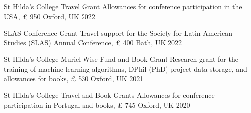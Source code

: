





\vspace{1mm}

\begin{cvhonors}
\cvhonor
{St Hilda's College Travel Grant} 
{Allowances for conference participation in the USA, {\pounds} 950} 
{Oxford, UK}
{2022}
\end{cvhonors}

\vspace{1mm}

\begin{cvhonors}
\cvhonor
{SLAS Conference Grant} 
{Travel support for the Society for Latin American Studies (SLAS) Annual Conference, {\pounds} 400}
{Bath, UK}
{2022}
\end{cvhonors}

\vspace{1mm}

\begin{cvhonors}
\cvhonor
{St Hilda's College Muriel Wise Fund and Book Grant} 
{Research grant for the training of machine learning algorithms, DPhil (PhD) project data storage, and allowances for books, {\pounds} 530} 
{Oxford, UK}
{2021}
\end{cvhonors}

\vspace{1mm}

\begin{cvhonors}
\cvhonor
{St Hilda's College Travel and Book Grants} 
{Allowances for conference participation in Portugal and books, {\pounds} 745} 
{Oxford, UK}
{2020}
\end{cvhonors}

